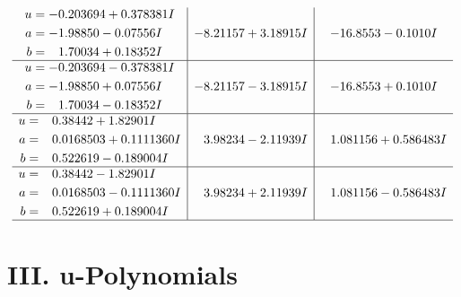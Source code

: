 \documentclass[1p]{elsarticle_modified}
\theoremstyle{definition}
\begin{document}
$$\begin{array}{c|c|c}
\begin{aligned}
u &= -0.203694 + 0.378381 I \\
a &= -1.98850 - 0.07556 I \\
b &= \phantom{-}1.70034 + 0.18352 I\end{aligned}
 & -8.21157 + 3.18915 I & -16.8553 - 0.1010 I \\ \hline\begin{aligned}
u &= -0.203694 - 0.378381 I \\
a &= -1.98850 + 0.07556 I \\
b &= \phantom{-}1.70034 - 0.18352 I\end{aligned}
 & -8.21157 - 3.18915 I & -16.8553 + 0.1010 I \\ \hline\begin{aligned}
u &= \phantom{-}0.38442 + 1.82901 I \\
a &= \phantom{-}0.0168503 + 0.1111360 I \\
b &= \phantom{-}0.522619 - 0.189004 I\end{aligned}
 & \phantom{-}3.98234 - 2.11939 I & \phantom{-}1.081156 + 0.586483 I \\ \hline\begin{aligned}
u &= \phantom{-}0.38442 - 1.82901 I \\
a &= \phantom{-}0.0168503 - 0.1111360 I \\
b &= \phantom{-}0.522619 + 0.189004 I\end{aligned}
 & \phantom{-}3.98234 + 2.11939 I & \phantom{-}1.081156 - 0.586483 I\\
 \hline 
 \end{array}$$\newpage
\newpage\renewcommand{\arraystretch}{1}
\centering \section*{ III. u-Polynomials}
\end{document}
